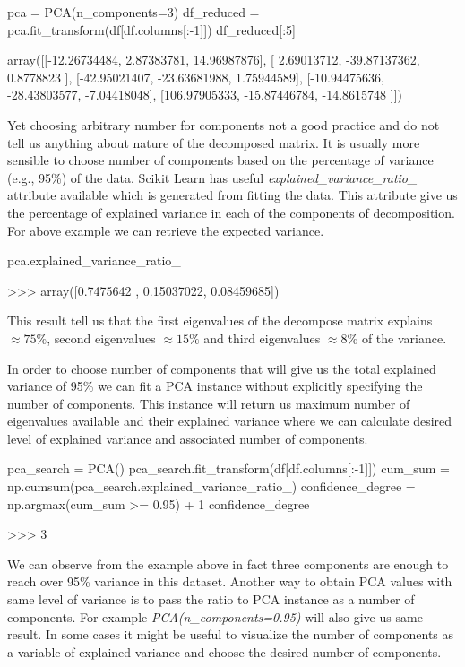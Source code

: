 \documentclass[12pt]{article}
\begin{document}
\begin{python}
    pca = PCA(n_components=3)
    df_reduced = pca.fit_transform(df[df.columns[:-1]])
    df_reduced[:5]

    array([[-12.26734484,   2.87383781,  14.96987876],
       [  2.69013712, -39.87137362,   0.8778823 ],
       [-42.95021407, -23.63681988,   1.75944589],
       [-10.94475636, -28.43803577,  -7.04418048],
       [106.97905333, -15.87446784, -14.8615748 ]])
\end{python}

Yet choosing arbitrary number for components not a good practice and do not tell us anything about nature of the decomposed matrix. It is usually more sensible to choose number of components based on the percentage of variance (e.g., 95\%) of the data. Scikit Learn has useful \textit{explained\_variance\_ratio\_} attribute available which is generated from fitting the data. This attribute give us the percentage of explained variance in each of the components of decomposition. For above example we can retrieve the expected variance.

\begin{python}
    pca.explained_variance_ratio_

    >>> array([0.7475642 , 0.15037022, 0.08459685])
\end{python}

This result tell us that the first eigenvalues of the decompose matrix explains $\approx 75\%$, second eigenvalues $\approx 15\%$ and third eigenvalues $\approx 8\%$ of the variance.

In order to choose number of components that will give us the total explained variance of 95\% we can fit a PCA instance without explicitly specifying the number of components. This instance will return us maximum number of eigenvalues available and their explained variance where we can calculate desired level of explained variance and associated number of components.

\begin{python}
    pca_search = PCA()
    pca_search.fit_transform(df[df.columns[:-1]])
    cum_sum = np.cumsum(pca_search.explained_variance_ratio_)
    confidence_degree = np.argmax(cum_sum >= 0.95) + 1
    confidence_degree

    >>> 3
\end{python}

We can observe from the example above in fact three components are enough to reach over 95\% variance in this dataset. Another way to obtain PCA values with same level of variance is to pass the ratio to PCA instance as a number of components. For example \textit{PCA(n\_components=0.95)} will also give us same result. In some cases it might be useful to visualize the number of components as a variable of explained variance and choose the desired number of components.
\end{document}
